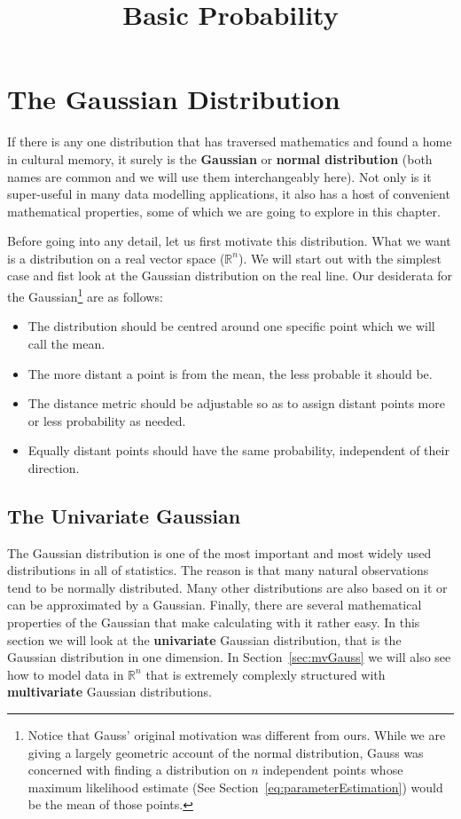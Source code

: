 \documentclass[a4paper,11pt,leqno]{report}\usepackage[]{graphicx}\usepackage[]{color}
\title{Basic Probability}
\date{}
\begin{document}
\setcounter{chapter}{5}


\chapter{The Gaussian Distribution}

If there is any one distribution that has traversed mathematics and found a home in cultural memory, it surely is the \textbf{Gaussian} or \textbf{normal distribution}
(both names are common and we will use them interchangeably here). 
Not only is it super-useful in many data modelling applications, it also has a host of convenient mathematical properties, some of which we are going
to explore in this chapter. 

Before going into any detail, let us first motivate this distribution. What we want is a distribution on a real vector space ($ \mathbb{R}^{n} $). We will
start out with the simplest case and fist look at the Gaussian distribution on the real line. Our desiderata for the Gaussian\footnote{Notice that Gauss' original
motivation was different from ours. While we are giving a largely geometric account of the normal distribution, Gauss was concerned with finding a distribution
on $ n $ independent points whose maximum likelihood estimate (See Section~\ref{eq:parameterEstimation}) would be the mean of those points.} are as follows:
\begin{itemize}
\item The distribution should be centred around one specific point which we will call the mean.
\item The more distant a point is from the mean, the less probable it should be.
\item The distance metric should be adjustable so as to assign distant points more or less probability as needed.
\item Equally distant points should have the same probability, independent of their direction.
\end{itemize}

\section{The Univariate Gaussian}

The Gaussian distribution is one of the most important and most widely used distributions in all of statistics. The reason is that many natural observations
tend to be normally distributed. Many other distributions are also based on it or can be approximated by a Gaussian. Finally, there are several mathematical
properties of the Gaussian that make calculating with it rather easy. In this section we will look at the \textbf{univariate} Gaussian distribution, that is
the Gaussian distribution in one dimension. In Section~\ref{sec:mvGauss} we will also see how to model data in $ \mathbb{R}^{n} $ that is extremely complexly 
structured with \textbf{multivariate} Gaussian distributions.
\end{document}
